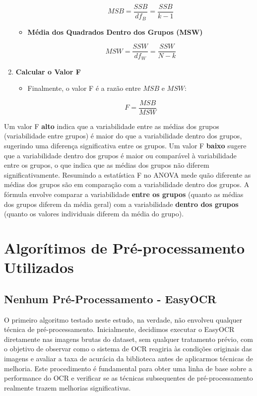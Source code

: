 \documentclass[conference]{IEEEtran}
\begin{document}
\begin{enumerate}
\begin{itemize}
        \[
        MSB = \frac{SSB}{df_B} = \frac{SSB}{k - 1}
        \]
        
        \item \textbf{Média dos Quadrados Dentro dos Grupos (MSW)}
        
         \[
        MSW = \frac{SSW}{df_W} = \frac{SSW}{N - k}
        \]
    \end{itemize}
    
        \item \textbf{Calcular o Valor F}
    \begin{itemize}
        \item Finalmente, o valor F é a razão entre \( MSB \) e \( MSW \):
        
        \[
        F = \frac{MSB}{MSW}
        \]
    \end{itemize}
\end{enumerate}

Um valor F \textbf{alto} indica que a variabilidade entre as médias dos grupos (variabilidade entre grupos) é maior do que a variabilidade dentro dos grupos, sugerindo uma diferença significativa entre os grupos. Um valor F \textbf{baixo} sugere que a variabilidade dentro dos grupos é maior ou comparável à variabilidade entre os grupos, o que indica que as médias dos grupos não diferem significativamente. Resumindo a estatística F no ANOVA mede quão diferente as médias dos grupos são em comparação com a variabilidade dentro dos grupos. A fórmula envolve comparar a variabilidade \textbf{entre os grupos} (quanto as médias dos grupos diferem da média geral) com a variabilidade \textbf{dentro dos grupos} (quanto os valores individuais diferem da média do grupo).

\section{Algorítimos de Pré-processamento Utilizados}

\subsection{Nenhum Pré-Processamento - EasyOCR}

O primeiro algoritmo testado neste estudo, na verdade, não envolveu qualquer técnica de pré-processamento. Inicialmente, decidimos executar o EasyOCR diretamente nas imagens brutas do dataset, sem qualquer tratamento prévio, com o objetivo de observar como o sistema de OCR reagiria às condições originais das imagens e avaliar a taxa de acurácia da biblioteca antes de aplicarmos técnicas de melhoria. Este procedimento é fundamental para obter uma linha de base sobre a performance do OCR e verificar se as técnicas subsequentes de pré-processamento realmente trazem melhorias significativas.
\end{document}

